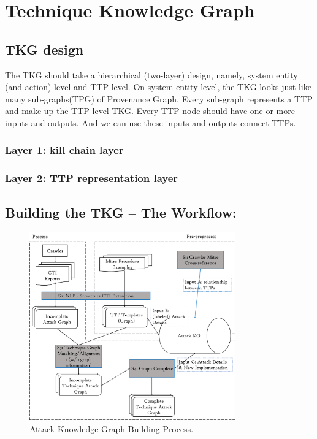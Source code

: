 \section{Technique Knowledge Graph}
\label{sec:tkg}

\subsection{TKG design}

The TKG should take a hierarchical (two-layer) design, namely, system entity (and action) level and TTP level. On system entity level, the TKG looks just like many sub-graphs(TPG) of Provenance Graph.  Every sub-graph represents a TTP and make up the TTP-level TKG. Every TTP node should have one or more inputs and outputs. And we can use these inputs and outputs connect TTPs.


\subsubsection{Layer 1: kill chain layer}

\subsubsection{Layer 2: TTP representation layer}

\subsection{Building the TKG – The Workflow:
}

\begin{figure}
    \centering
    \includegraphics[width=3.5in]{Image/architecture.png}
    \caption{Attack Knowledge Graph Building Process.}
    \label{fig:architecture}
\end{figure}

